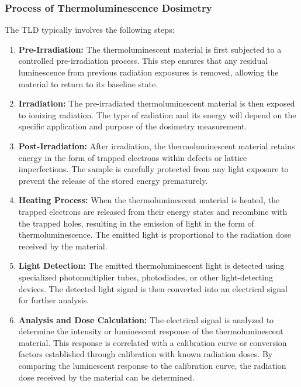 \documentclass[../../Report.tex]{subfiles}
\begin{document}
    \subsubsection*{\large Process of Thermoluminescence Dosimetry}
        The TLD typically involves the following steps:
        \begin{enumerate}
            \item \textbf{Pre-Irradiation: } The thermoluminescent material is first subjected to a controlled 
            pre-irradiation process. This step ensures that any residual luminescence from previous radiation 
            exposures is removed, allowing the material to return to its baseline state.

            \item \textbf{Irradiation: } The pre-irradiated thermoluminescent material is then exposed to ionizing 
            radiation. The type of radiation and its energy will depend on the specific application and purpose of 
            the dosimetry measurement.

            \item \textbf{Post-Irradiation: } After irradiation, the thermoluminescent material retains energy in the 
            form of trapped electrons within defects or lattice imperfections. The sample is carefully protected from 
            any light exposure to prevent the release of the stored energy prematurely.

            \item \textbf{Heating Process: } When the thermoluminescent material is heated, the trapped electrons are 
            released from their energy states and recombine with the trapped holes, resulting in the emission of light 
            in the form of thermoluminescence. The emitted light is proportional to the radiation dose received by the 
            material.

            \item \textbf{Light Detection: } The emitted thermoluminescent light is detected using specialized 
            photomultiplier tubes, photodiodes, or other light-detecting devices. The detected light signal is then 
            converted into an electrical signal for further analysis.

            \item \textbf{Analysis and Dose Calculation: } The electrical signal is analyzed to determine the intensity 
            or luminescent response of the thermoluminescent material. This response is correlated with a calibration 
            curve or conversion factors established through calibration with known radiation doses. By comparing the 
            luminescent response to the calibration curve, the radiation dose received by the material can be determined.

        \end{enumerate}
\end{document}

